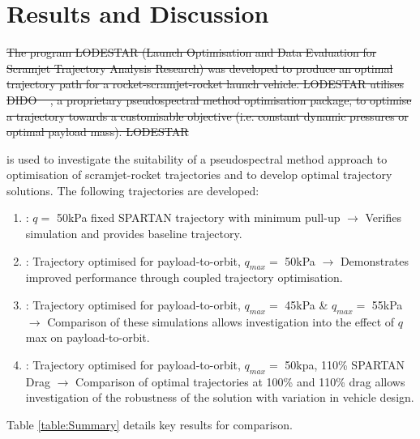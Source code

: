 \documentclass[journal]{new-aiaa}
\providecommand{\DIFadd}[1]{{\protect\color{blue}\uwave{#1}}} %
\providecommand{\DIFdel}[1]{{\protect\color{red}\sout{#1}}}                      %
\providecommand{\DIFaddbegin}{} %
\providecommand{\DIFaddend}{} %
\providecommand{\DIFdelbegin}{} %
\providecommand{\DIFdelend}{} %
\newcommand{\DIFscaledelfig}{0.5}
\newlength{\DIFdelgraphicswidth} %
\newlength{\DIFdelgraphicsheight} %
\newcommand{\DIFaddincludegraphics}[2][]{{\color{blue}\fbox{\DIFOincludegraphics[#1]{#2}}}} %
\newcommand{\DIFdelincludegraphics}[2][]{%
\sbox{\DIFdelgraphicsbox}{\DIFOincludegraphics[#1]{#2}}%
\settoboxwidth{\DIFdelgraphicswidth}{\DIFdelgraphicsbox} %
\settoboxtotalheight{\DIFdelgraphicsheight}{\DIFdelgraphicsbox} %
\scalebox{\DIFscaledelfig}{%
\parbox[b]{\DIFdelgraphicswidth}{\usebox{\DIFdelgraphicsbox}\\[-\baselineskip] \rule{\DIFdelgraphicswidth}{0em}}\llap{\resizebox{\DIFdelgraphicswidth}{\DIFdelgraphicsheight}{%
\setlength{\unitlength}{\DIFdelgraphicswidth}%
\begin{picture}(1,1)%
\thicklines\linethickness{2pt} %
{\color[rgb]{1,0,0}\put(0,0){\framebox(1,1){}}}%
{\color[rgb]{1,0,0}\put(0,0){\line( 1,1){1}}}%
{\color[rgb]{1,0,0}\put(0,1){\line(1,-1){1}}}%
\end{picture}%
}\hspace*{3pt}}} %
} %
\DeclareRobustCommand{\DIFaddbegin}{\DIFOaddbegin \let\includegraphics\DIFaddincludegraphics} %
\DeclareRobustCommand{\DIFaddend}{\DIFOaddend \let\includegraphics\DIFOincludegraphics} %
\DeclareRobustCommand{\DIFdelbegin}{\DIFOdelbegin \let\includegraphics\DIFdelincludegraphics} %
\DeclareRobustCommand{\DIFdelend}{\DIFOaddend \let\includegraphics\DIFOincludegraphics} %
\begin{document}
\section{Results and Discussion} \label{section:results}
\DIFdelbegin \DIFdel{The program LODESTAR (Launch Optimisation and Data Evaluation for Scramjet Trajectory Analysis Research) was developed to produce an optimal trajectory path for a rocket-scramjet-rocket launch vehicle. LODESTAR utilises DIDO \mbox{%
\cite{Ross,Ross2004}}%
, a proprietary pseudospectral method optimisation package, to optimise a trajectory towards a customisable objective (i.e. constant dynamic pressures or optimal payload mass). 
LODESTAR }\DIFdelend \DIFaddbegin 



\DIFadd{LODESTAR }\DIFaddend is used to investigate the suitability of a pseudospectral method approach to optimisation of scramjet-rocket trajectories and to develop optimal trajectory solutions. The following trajectories are developed: 
\begin{enumerate}
	\item: $q = $ 50kPa fixed SPARTAN trajectory with minimum pull-up \newline$\rightarrow$ Verifies simulation and provides baseline trajectory.
	\item: Trajectory optimised for payload-to-orbit, $q_{max} = $ 50kPa \newline$\rightarrow$ Demonstrates improved performance through coupled trajectory optimisation.
	\item: Trajectory optimised for payload-to-orbit, $q_{max} = $ 45kPa \& $q_{max} = $ 55kPa \newline$\rightarrow$ Comparison of these simulations allows investigation into the effect of $q$ max on payload-to-orbit.
	\item: Trajectory optimised for payload-to-orbit,  $q_{max} = $ 50kpa, 110\% SPARTAN Drag \newline$\rightarrow$ Comparison of optimal trajectories at 100\% and 110\% drag allows investigation of the robustness of the solution with variation in vehicle design. 
\end{enumerate}

Table \ref{table:Summary} details key results for comparison. 
\end{document}
